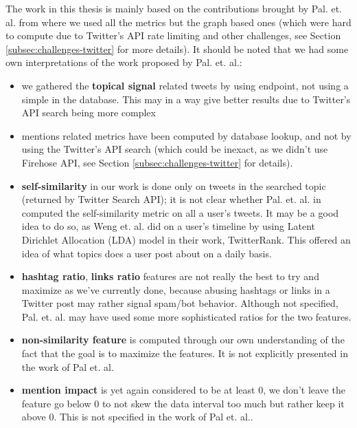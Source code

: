 The work in this thesis is mainly based on the contributions brought by Pal. et. al.\cite{microblogs} from where we used all the metrics but the graph based ones (which were hard to compute due to Twitter's API rate limiting and other challenges, see Section \ref{subsec:challenges-twitter} for more details). It should be noted that we had some own interpretations of the work proposed by Pal. et. al.\cite{microblogs}:
\begin{itemize}
	\item we gathered the \textbf{topical signal} related tweets by using  endpoint, not using a simple  in the database. This may in a way give better results due to Twitter's API search being more complex
    \item mentions related metrics  have been computed by database lookup, and not by using the Twitter's API search (which could be inexact, as we didn't use Firehose API, see Section \ref{subsec:challenges-twitter} for details).
    \item \textbf{self-similarity} in our work is done only on tweets in the searched topic (returned by Twitter Search API); it is not clear whether Pal. et. al. in \cite{microblogs} computed the self-similarity metric on all a user's tweets. It may be a good idea to do so, as Weng et. al. did on a user's timeline by using Latent Dirichlet Allocation (LDA) model\cite{lda} in their work, TwitterRank\cite{twitterrank}. This offered an idea of what topics does a user post about on a daily basis.
    \item \textbf{hashtag ratio}, \textbf{links ratio} features are not really the best to try and maximize as we've currently done, because abusing hashtags or links in a Twitter post may rather signal spam/bot behavior. Although not specified, Pal. et. al. may have used some more sophisticated ratios for the two features.
    \item \textbf{non-similarity feature} is computed through our own understanding of the fact that the goal is to maximize the features. It is not explicitly presented in the work of Pal et. al.\cite{microblogs}
    \item \textbf{mention impact} is yet again considered to be at least 0, we don't leave the feature go below 0 to not skew the data interval too much but rather keep it above 0. This is not specified in the work of Pal et. al.\cite{microbogs}.
\end{itemize}

